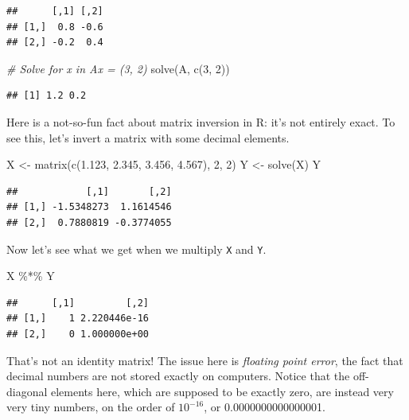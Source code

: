 \documentclass[
  12pt,
  oneside,openany]{book}
\newenvironment{Shaded}{\begin{snugshade}}{\end{snugshade}}
\newcommand{\CommentTok}[1]{\textcolor[rgb]{0.56,0.35,0.01}{\textit{#1}}}
\newcommand{\DecValTok}[1]{\textcolor[rgb]{0.00,0.00,0.81}{#1}}
\newcommand{\FloatTok}[1]{\textcolor[rgb]{0.00,0.00,0.81}{#1}}
\newcommand{\FunctionTok}[1]{\textcolor[rgb]{0.00,0.00,0.00}{#1}}
\newcommand{\NormalTok}[1]{#1}
\newcommand{\OtherTok}[1]{\textcolor[rgb]{0.56,0.35,0.01}{#1}}
\newcommand{\SpecialCharTok}[1]{\textcolor[rgb]{0.00,0.00,0.00}{#1}}
\begin{document}
\begin{verbatim}
##      [,1] [,2]
## [1,]  0.8 -0.6
## [2,] -0.2  0.4
\end{verbatim}

\begin{Shaded}
\begin{Highlighting}[]
\CommentTok{\# Solve for x in Ax = (3, 2)}
\FunctionTok{solve}\NormalTok{(A, }\FunctionTok{c}\NormalTok{(}\DecValTok{3}\NormalTok{, }\DecValTok{2}\NormalTok{))}
\end{Highlighting}
\end{Shaded}

\begin{verbatim}
## [1] 1.2 0.2
\end{verbatim}

Here is a not-so-fun fact about matrix inversion in R: it's not entirely exact. To see this, let's invert a matrix with some decimal elements.

\begin{Shaded}
\begin{Highlighting}[]
\NormalTok{X }\OtherTok{\textless{}{-}} \FunctionTok{matrix}\NormalTok{(}\FunctionTok{c}\NormalTok{(}\FloatTok{1.123}\NormalTok{, }\FloatTok{2.345}\NormalTok{, }\FloatTok{3.456}\NormalTok{, }\FloatTok{4.567}\NormalTok{), }\DecValTok{2}\NormalTok{, }\DecValTok{2}\NormalTok{)}
\NormalTok{Y }\OtherTok{\textless{}{-}} \FunctionTok{solve}\NormalTok{(X)}
\NormalTok{Y}
\end{Highlighting}
\end{Shaded}

\begin{verbatim}
##            [,1]       [,2]
## [1,] -1.5348273  1.1614546
## [2,]  0.7880819 -0.3774055
\end{verbatim}

Now let's see what we get when we multiply \texttt{X} and \texttt{Y}.

\begin{Shaded}
\begin{Highlighting}[]
\NormalTok{X }\SpecialCharTok{\%*\%}\NormalTok{ Y}
\end{Highlighting}
\end{Shaded}

\begin{verbatim}
##      [,1]         [,2]
## [1,]    1 2.220446e-16
## [2,]    0 1.000000e+00
\end{verbatim}

That's not an identity matrix! The issue here is \emph{floating point error}, the fact that decimal numbers are not stored exactly on computers. Notice that the off-diagonal elements here, which are supposed to be exactly zero, are instead very very tiny numbers, on the order of \(10^{-16}\), or 0.0000000000000001.
\end{document}
